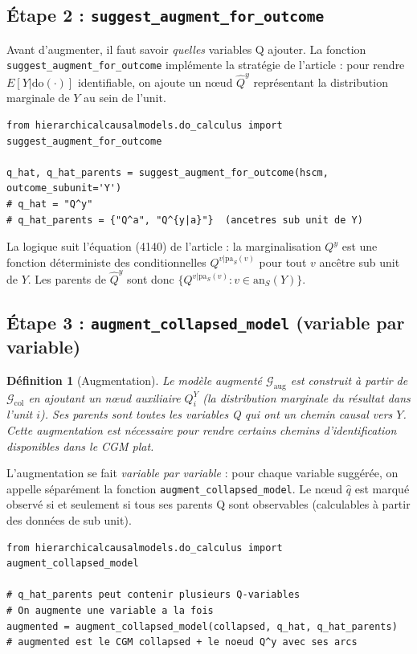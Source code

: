 \documentclass[11pt,a4paper]{article}
\newcommand{\rmdo}{\mathrm{do}}
\newcommand{\col}{\mathrm{col}}
\newcommand{\aug}{\mathrm{aug}}
\newtheorem{definition}{Définition}
\begin{document}
\subsection{Étape 2 : \texttt{suggest\_augment\_for\_outcome}}

Avant d'augmenter, il faut savoir \emph{quelles} variables Q ajouter.
La fonction \texttt{suggest\_augment\_for\_outcome} implémente la stratégie de l'article : pour rendre $E[Y|\rmdo(\cdot)]$ identifiable, on ajoute un nœud $\hat{Q}^y$ représentant la distribution marginale de $Y$ au sein de l'unit.

\begin{lstlisting}[caption={Suggestion des variables d'augmentation}]
from hierarchicalcausalmodels.do_calculus import suggest_augment_for_outcome

q_hat, q_hat_parents = suggest_augment_for_outcome(hscm, outcome_subunit='Y')
# q_hat = "Q^y"
# q_hat_parents = {"Q^a", "Q^{y|a}"}  (ancetres sub unit de Y)
\end{lstlisting}

La logique suit l'équation (4140) de l'article : la marginalisation $Q^y$ est une fonction déterministe des conditionnelles $Q^{v|\text{pa}_S(v)}$ pour tout $v$ ancêtre sub unit de $Y$.
Les parents de $\hat{Q}^y$ sont donc $\{Q^{v|\text{pa}_S(v)} : v \in \text{an}_S(Y)\}$.

\subsection{Étape 3 : \texttt{augment\_collapsed\_model} (variable par variable)}

\begin{definition}[Augmentation]
Le modèle augmenté $\mathcal{G}_\aug$ est construit à partir de $\mathcal{G}_\col$ en ajoutant un nœud auxiliaire $Q^Y_i$ (la distribution marginale du résultat dans l'unit $i$).
Ses parents sont toutes les variables Q qui ont un chemin causal vers $Y$.
Cette augmentation est nécessaire pour rendre certains chemins d'identification disponibles dans le CGM plat.
\end{definition}

L'augmentation se fait \emph{variable par variable} : pour chaque variable suggérée, on appelle séparément la fonction \texttt{augment\_collapsed\_\allowbreak model}.
Le nœud $\hat{q}$ est marqué observé si et seulement si tous ses parents Q sont observables (calculables à partir des données de sub unit).

\begin{lstlisting}[caption={Augmentation variable par variable}]
from hierarchicalcausalmodels.do_calculus import augment_collapsed_model

# q_hat_parents peut contenir plusieurs Q-variables
# On augmente une variable a la fois
augmented = augment_collapsed_model(collapsed, q_hat, q_hat_parents)
# augmented est le CGM collapsed + le noeud Q^y avec ses arcs
\end{lstlisting}
\end{document}
